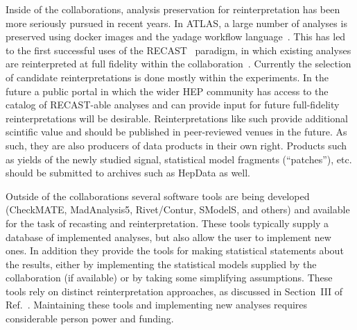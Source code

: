 \documentclass[11pt]{article}
\begin{document}






Inside of the collaborations, analysis preservation for reinterpretation has been more seriously pursued in recent years. In ATLAS, a large number of analyses is preserved using docker images and the yadage workflow language~\cite{Cranmer:2017frf,Cranmer_2015}. This has led to the first successful uses of the RECAST~\cite{Cranmer:2010hk} paradigm, in which existing analyses are reinterpreted at full fidelity within the collaboration~\cite{RECAST1, RECAST2, RECAST3}. Currently the selection of candidate reinterpretations is done mostly within the experiments. In the future a public portal in which the wider HEP community has access to the catalog of RECAST-able analyses and can provide input for future full-fidelity reinterpretations will be desirable. Reinterpretations like such provide additional scintific value and should be published in peer-reviewed venues in the future. As such, they are also producers of data products in their own right. Products such as yields of the newly studied signal, statistical model fragments (``patches''), etc. should be submitted to archives such as HepData as well.

Outside of the collaborations several software tools are being developed (CheckMATE, MadAnalysis5, Rivet/Contur, SModelS, and others) and available for the task of recasting and reinterpretation. These tools typically supply a database of implemented analyses, but also allow the user to implement new ones. %
In addition they provide the tools for making statistical statements about the results, either by implementing the statistical models supplied by the collaboration (if available) or by taking some simplifying assumptions.
These tools rely on distinct reinterpretation approaches, as discussed in Section~III of Ref.~\cite{LHCReinterpretationForum:2020xtr}.
Maintaining these tools and implementing new analyses requires considerable person power and funding.
\end{document}
